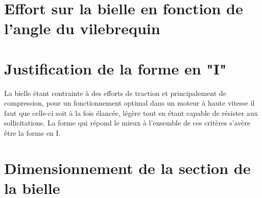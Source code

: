 \documentclass{article}
\begin{document}
\section{Effort sur la bielle en fonction de l'angle du vilebrequin}
\section{Justification de la forme en "I"}
La bielle étant contrainte à des efforts de traction et principalement de compression, pour un fonctionnement optimal dans un moteur à haute vitesse il faut que celle-ci soit à la fois élancée, légère tout en étant capable de résister aux sollicitations. La forme qui répond le mieux à l'ensemble de ces critères s'avère être la forme en I.
\section{Dimensionnement de la section de la bielle}
\end{document}
